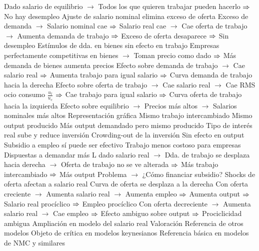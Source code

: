 \documentclass{nuevotema}
\begin{document}
\begin{esquemal}
				\4[] Dado salario de equilibrio
				\4[] $\to$ Todos los que quieren trabajar pueden hacerlo
				\4[] $\then$ No hay desempleo
				\4 Ajuste de salario nominal elimina exceso de oferta
				\4[] Exceso de demanda
				\4[] $\to$ Salario nominal cae
				\4[] $\then$ Salario real cae
				\4[] $\to$ Cae oferta de trabajo
				\4[] $\to$ Aumenta demanda de trabajo
				\4[] $\then$ Exceso de oferta desaparece
				\4[] $\then$ Sin desempleo
				\4 Estímulos de dda. en bienes sin efecto en trabajo
				\4[] Empresas perfectamente competitivas en bienes
				\4[] $\to$ Toman precio como dado
				\4[] $\then$ Más demanda de bienes aumenta precios
				\4[] Efecto sobre demanda de trabajo
				\4[] $\to$ Cae salario real
				\4[] $\then$ Aumenta trabajo para igual salario
				\4[] $\then$ Curva demanda de trabajo hacia la derecha
				\4[] Efecto sobre oferta de trabajo
				\4[] $\to$ Cae salario real
				\4[] $\to$ Cae RMS ocio consumo $\frac{u_l}{u_c}$
				\4[] $\then$ Cae trabajo para igual salario
				\4[] $\then$ Curva oferta de trabajo hacia la izquierda
				\4[] Efecto sobre equilibrio
				\4[] $\to$ Precios más altos
				\4[] $\to$ Salarios nominales más altos
				\4[] Representación gráfica
				\4[] 
				\4[$\then$] Mismo trabajo intercambiado
				\4[$\then$] Mismo output producido
				\4[$\then$] Más output demandado pero mismo producido
				\4[$\then$] Tipo de interés real sube y reduce inversión
				\4[$\then$] Crowding-out de la inversión
				\4[$\then$] Sin efecto en output
				\4 Subsidio a empleo sí puede ser efectivo
				\4[] Trabajo menos costoso para empresas
				\4[] Dispuestas a demandar más L dado salario real
				\4[] $\to$ Dda. de trabajo se desplaza hacia derecha
				\4[] $\to$ Oferta de trabajo no se ve alterada
				\4[] $\then$ Más trabajo intercambiado
				\4[] $\then$ Más output
				\4[] Problema
				\4[] $\to$ ¿Cómo financiar subsidio?
				\4 Shocks de oferta afectan a salario real
				\4[] Curva de oferta se desplaza a la derecha
				\4[] Con oferta creciente
				\4[] $\to$ Aumenta salario real
				\4[] $\to$ Aumenta empleo
				\4[] $\then$ Aumenta output
				\4[] $\then$ Salario real procíclico
				\4[] $\then$ Empleo procíclico
				\4[] Con oferta decreciente
				\4[] $\to$ Aumenta salario real
				\4[] $\to$ Cae empleo
				\4[] $\then$ Efecto ambiguo sobre output
				\4[] $\then$ Prociclicidad ambigua
				\4[] Ampliación en modelo del salario real
			\3 Valoración
				\4 Referencia de otros modelos
				\4[] Objeto de crítica en modelos keynesianos
				\4[] Referencia básica en modelos de NMC y similares

\end{esquemal}
\end{document}
